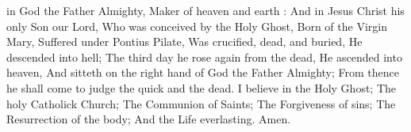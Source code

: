  in God the Father Almighty, Maker of heaven and earth :
And in Jesus Christ his only Son our Lord, Who was conceived by the Holy Ghost, Born of the Virgin Mary, Suffered under Pontius Pilate, Was crucified, dead, and buried, He descended into hell;
The third day he rose again from the dead, He ascended into heaven, And sitteth on the right hand of God the Father Almighty; From thence he shall come to judge the quick and the dead.
I believe in the Holy Ghost; The holy Catholick Church; The Communion of Saints; The Forgiveness of sins; The Resurrection of the body; And the Life everlasting.
Amen.
